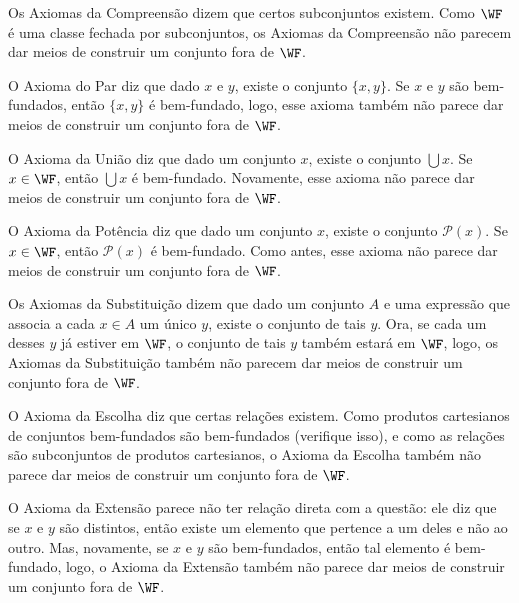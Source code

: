 Os Axiomas da Compreensão dizem que certos subconjuntos existem.
Como $\WF$ é uma classe fechada por subconjuntos, os Axiomas da Compreensão não parecem dar meios de construir um conjunto fora de $\WF$.

O Axioma do Par diz que dado $x$ e $y$, existe o conjunto $\{x, y\}$.
Se $x$ e $y$ são bem-fundados, então $\{x, y\}$ é bem-fundado, logo, esse axioma também não parece dar meios de construir um conjunto fora de $\WF$.

O Axioma da União diz que dado um conjunto $x$, existe o conjunto $\bigcup x$.
Se $x\in \WF$, então $\bigcup x$ é bem-fundado.
Novamente, esse axioma não parece dar meios de construir um conjunto fora de $\WF$.

O Axioma da Potência diz que dado um conjunto $x$, existe o conjunto $\mathcal P(x)$.
Se $x\in \WF$, então $\mathcal P(x)$ é bem-fundado.
Como antes, esse axioma não parece dar meios de construir um conjunto fora de $\WF$.

Os Axiomas da Substituição dizem que dado um conjunto $A$ e uma expressão que associa a cada $x\in A$ um único $y$, existe o conjunto de tais $y$.
Ora, se cada um desses $y$ já estiver em $\WF$, o conjunto de tais $y$ também estará em $\WF$, logo, os Axiomas da Substituição também não parecem dar meios de construir um conjunto fora de $\WF$.

O Axioma da Escolha diz que certas relações existem.
Como produtos cartesianos de conjuntos bem-fundados são bem-fundados (verifique isso), e como as relações são subconjuntos de produtos cartesianos, o Axioma da Escolha também não parece dar meios de construir um conjunto fora de $\WF$.

O Axioma da Extensão parece não ter relação direta com a questão: ele diz que se $x$ e $y$ são distintos, então existe um elemento que pertence a um deles e não ao outro.
Mas, novamente, se $x$ e $y$ são bem-fundados, então tal elemento é bem-fundado, logo, o Axioma da Extensão também não parece dar meios de construir um conjunto fora de $\WF$.

